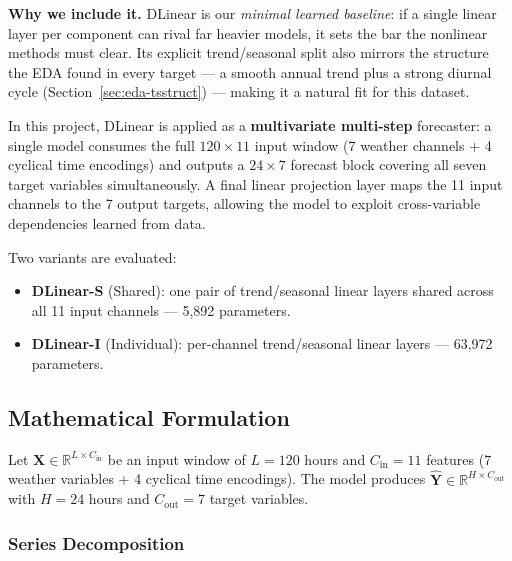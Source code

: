 \documentclass[12pt,a4paper,oneside]{report}
\begin{document}
\textbf{Why we include it.} DLinear is our \emph{minimal learned baseline}: if a
single linear layer per component can rival far heavier models, it sets the bar
the nonlinear methods must clear. Its explicit trend/seasonal split also mirrors
the structure the EDA found in every target --- a smooth annual trend plus a
strong diurnal cycle (Section~\ref{sec:eda-tsstruct}) --- making it a natural fit
for this dataset.

In this project, DLinear is applied as a \textbf{multivariate multi-step}
forecaster: a single model consumes the full $120 \times 11$ input window
(7 weather channels + 4 cyclical time encodings) and outputs a $24 \times 7$
forecast block covering all seven target variables simultaneously. A final linear
projection layer maps the 11 input channels to the 7 output targets, allowing the
model to exploit cross-variable dependencies learned from data.

Two variants are evaluated:
\begin{itemize}
  \item \textbf{DLinear-S} (Shared): one pair of trend/seasonal linear layers
        shared across all 11 input channels --- 5,892 parameters.
  \item \textbf{DLinear-I} (Individual): per-channel trend/seasonal linear
        layers --- 63,972 parameters.
\end{itemize}

\subsection{Mathematical Formulation}

Let $\mathbf{X} \in \mathbb{R}^{L \times C_{\text{in}}}$ be an input window of
$L = 120$ hours and $C_{\text{in}} = 11$ features (7 weather variables + 4
cyclical time encodings). The model produces
$\mathbf{\hat{Y}} \in \mathbb{R}^{H \times C_{\text{out}}}$ with $H = 24$ hours
and $C_{\text{out}} = 7$ target variables.

\subsubsection{Series Decomposition}
\end{document}
